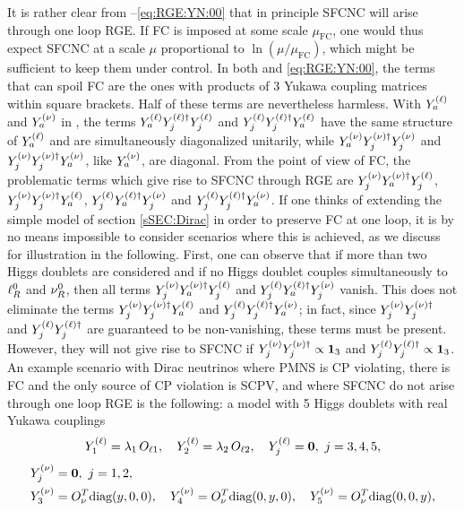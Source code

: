 \documentclass[12pt,a4paper]{article}
\begin{document}
It is rather clear from --\eqref{eq:RGE:YN:00} that in principle SFCNC will arise through one loop RGE. If FC is imposed at some scale $\mu_\mathrm{FC}$, one would thus expect SFCNC at a scale $\mu$ proportional to $\ln(\mu/\mu_\mathrm{FC})$, which might be sufficient to keep them under control. In both  and  \eqref{eq:RGE:YN:00}, the terms that can spoil FC are the ones with products of 3 Yukawa coupling matrices within square brackets. Half of these terms are nevertheless harmless. With $Y_{a}^{\rm (\ell)}$ and $Y_{a}^{\rm (\nu)}$ in , the terms $Y_{a}^{\rm (\ell)}Y_{j}^{\rm (\ell)\dagger}Y_{j}^{\rm (\ell)}$ and $Y_{j}^{\rm (\ell)}Y_{j}^{\rm (\ell)\dagger}Y_{a}^{\rm (\ell)}$ have the same structure of $Y_{a}^{\rm (\ell)}$ and are simultaneously diagonalized unitarily, while $Y_{a}^{\rm (\nu)}Y_{j}^{\rm (\nu)\dagger}Y_{j}^{\rm (\nu)}$ and $Y_{j}^{\rm (\nu)}Y_{j}^{\rm (\nu)\dagger}Y_{a}^{\rm (\nu)}$, like $Y_{a}^{\rm (\nu)}$, are diagonal. From the point of view of FC, the problematic terms which give rise to SFCNC through RGE are $Y_{j}^{\rm (\nu)}Y_{a}^{\rm (\nu)\dagger}Y_{j}^{\rm (\ell)}$, $Y_{j}^{\rm (\nu)}Y_{j}^{\rm (\nu)\dagger}Y_{a}^{\rm (\ell)}$, $Y_{j}^{\rm (\ell)}Y_{a}^{\rm (\ell)\dagger}Y_{j}^{\rm (\nu)}$ and $Y_{j}^{\rm (\ell)}Y_{j}^{\rm (\ell)\dagger}Y_{a}^{\rm (\nu)}$. If one thinks of extending the simple model of section \ref{sSEC:Dirac} in order to preserve FC at one loop, it is by no means impossible to consider scenarios where this is achieved, as we discuss for illustration in the following. First, one can observe that if more than two Higgs doublets are considered and if no Higgs doublet couples simultaneously to $\ell_R^0$ and $\nu_R^0$, then all terms $Y_{j}^{\rm (\nu)}Y_{a}^{\rm (\nu)\dagger}Y_{j}^{\rm (\ell)}$ and $Y_{j}^{\rm (\ell)}Y_{a}^{\rm (\ell)\dagger}Y_{j}^{\rm (\nu)}$ vanish. This does not eliminate the terms $Y_{j}^{\rm (\nu)}Y_{j}^{\rm (\nu)\dagger}Y_{a}^{\rm (\ell)}$ and $Y_{j}^{\rm (\ell)}Y_{j}^{\rm (\ell)\dagger}Y_{a}^{\rm (\nu)}$; in fact, since $Y_{j}^{\rm (\nu)}Y_{j}^{\rm (\nu)\dagger}$ and $Y_{j}^{\rm (\ell)}Y_{j}^{\rm (\ell)\dagger}$ are guaranteed to be non-vanishing, these terms must be present. However, they will not give rise to SFCNC if $Y_{j}^{\rm (\nu)}Y_{j}^{\rm (\nu)\dagger}\propto \mathbf{1}_3$ and $Y_{j}^{\rm (\ell)}Y_{j}^{\rm (\ell)\dagger}\propto \mathbf{1}_3$. An example scenario with Dirac neutrinos where PMNS is CP violating, there is FC and the only source of CP violation is SCPV, and where SFCNC do not arise through one loop RGE is the following: a model with 5 Higgs doublets with real Yukawa couplings
\begin{equation}
 Y_{1}^{\rm (\ell)}=\lambda_1\,O_{\ell 1},\quad Y_{2}^{\rm (\ell)}=\lambda_2\,O_{\ell 2},\quad Y_{j}^{\rm (\ell)}=\mathbf{0},\ j=3,4,5,
\end{equation}
\begin{equation}
\begin{aligned}
 &Y_{j}^{\rm (\nu)}=\mathbf{0},\ j=1,2,\\ 
 &Y_{3}^{\rm (\nu)}=O_\nu^T\text{diag}(y,0,0),\quad Y_{4}^{\rm (\nu)}=O_\nu^T\text{diag}(0,y,0),\quad Y_{5}^{\rm (\nu)}=O_\nu^T\text{diag}(0,0,y),
 \end{aligned}
\end{equation}
\end{document}
